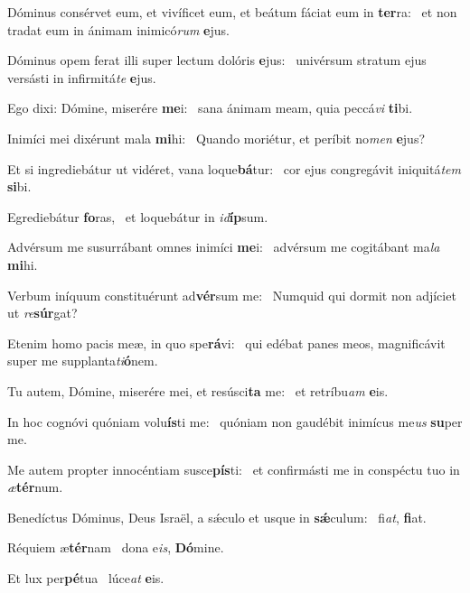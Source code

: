 \item Dóminus consérvet eum, et vivíficet eum, et beátum fáciat eum in \textbf{ter}ra:~\psstar{} et non tradat eum in ánimam inimicó\textit{rum} \textbf{e}jus.

\item Dóminus opem ferat illi super lectum dolóris \textbf{e}jus:~\psstar{} univérsum stratum ejus versásti in infirmitá\textit{te} \textbf{e}jus.

\item Ego dixi: Dómine, miserére \textbf{me}i:~\psstar{} sana ánimam meam, quia peccá\textit{vi} \textbf{ti}bi.

\item Inimíci mei dixérunt mala \textbf{mi}hi:~\psstar{} Quando moriétur, et períbit no\textit{men} \textbf{e}jus?

\item Et si ingrediebátur ut vidéret, vana loque\textbf{bá}tur:~\psstar{} cor ejus congregávit iniquitá\textit{tem} \textbf{si}bi.

\item Egrediebátur \textbf{fo}ras,~\psstar{} et loquebátur in \textit{id}\textbf{íp}sum.

\item Advérsum me susurrábant omnes inimíci \textbf{me}i:~\psstar{} advérsum me cogitábant ma\textit{la} \textbf{mi}hi.

\item Verbum iníquum constituérunt ad\textbf{vér}sum me:~\psstar{} Numquid qui dormit non adjíciet ut \textit{re}\textbf{súr}gat?

\item Etenim homo pacis meæ, in quo spe\textbf{rá}vi:~\psstar{} qui edébat panes meos, magnificávit super me supplanta\textit{ti}\textbf{ó}nem.

\item Tu autem, Dómine, miserére mei, et resúsci\textbf{ta} me:~\psstar{} et retríbu\textit{am} \textbf{e}is.

\item In hoc cognóvi quóniam volu\textbf{ís}ti me:~\psstar{} quóniam non gaudébit inimícus me\textit{us} \textbf{su}per me.

\item Me autem propter innocéntiam susce\textbf{pís}ti:~\psstar{} et confirmásti me in conspéctu tuo in \textit{æ}\textbf{tér}num.

\item Benedíctus Dóminus, Deus Israël, a sǽculo et usque in \textbf{sǽ}culum:~\psstar{} fi\textit{at}, \textbf{fi}at.

\item Réquiem æ\textbf{tér}nam~\psstar{} dona e\textit{is}, \textbf{Dó}mine.

\item Et lux per\textbf{pé}tua~\psstar{} lúce\textit{at} \textbf{e}is.